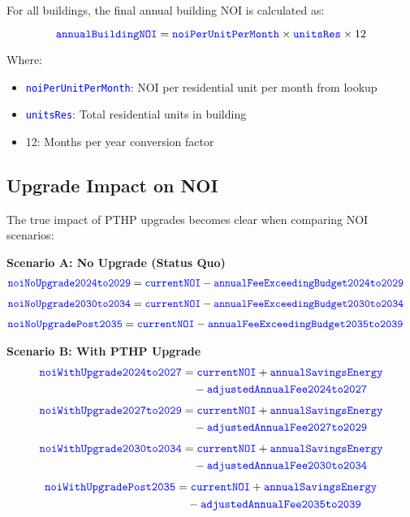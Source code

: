 \documentclass{article}
\newcommand{\code}[1]{\textcolor{blue}{\texttt{#1}}}
\begin{document}
For all buildings, the final annual building NOI is calculated as:

\begin{equation}
\code{annualBuildingNOI} = \code{noiPerUnitPerMonth} \times \code{unitsRes} \times 12
\end{equation}

Where:
\begin{itemize}
    \item \code{noiPerUnitPerMonth}: NOI per residential unit per month from lookup
    \item \code{unitsRes}: Total residential units in building
    \item 12: Months per year conversion factor
\end{itemize}

\subsection{Upgrade Impact on NOI}

The true impact of PTHP upgrades becomes clear when comparing NOI scenarios:

\textbf{Scenario A: No Upgrade (Status Quo)}
\begin{align}
\code{noiNoUpgrade2024to2029} &= \code{currentNOI} - \code{annualFeeExceedingBudget2024to2029}
\end{align}
\begin{align}
\code{noiNoUpgrade2030to2034} &= \code{currentNOI} - \code{annualFeeExceedingBudget2030to2034}
\end{align}
\begin{align}
\code{noiNoUpgradePost2035} &= \code{currentNOI} - \code{annualFeeExceedingBudget2035to2039}
\end{align}

\textbf{Scenario B: With PTHP Upgrade}
\begin{align}
\code{noiWithUpgrade2024to2027} &= \code{currentNOI} + \code{annualSavingsEnergy} \nonumber\\
&\quad - \code{adjustedAnnualFee2024to2027}
\end{align}
\begin{align}
\code{noiWithUpgrade2027to2029} &= \code{currentNOI} + \code{annualSavingsEnergy} \nonumber\\
&\quad - \code{adjustedAnnualFee2027to2029}
\end{align}
\begin{align}
\code{noiWithUpgrade2030to2034} &= \code{currentNOI} + \code{annualSavingsEnergy} \nonumber\\
&\quad - \code{adjustedAnnualFee2030to2034}
\end{align}
\begin{align}
\code{noiWithUpgradePost2035} &= \code{currentNOI} + \code{annualSavingsEnergy} \nonumber\\
&\quad - \code{adjustedAnnualFee2035to2039}
\end{align}
\end{document}
